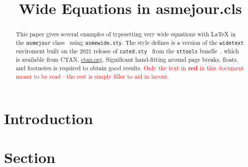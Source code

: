 


\title{Wide Equations in asmejour.cls}
    
\begin{abstract}
This paper gives several examples of typesetting very wide equations with {\upshape\LaTeX} in the {\upshape\texttt{asmejour}} class~{\upshape\cite{lienhard2021}} using 
{\upshape\texttt{asmewide.sty}}. The style defines is a version of the {\upshape\texttt{widetext}} enviroment built on the 2021 release of 
{\upshape\texttt{cuted.sty}}~{\upshape\cite{tolucsis1}} from the
{\upshape\texttt{sttools}} bundle~{\upshape\cite{tolucsis2}}, which is available from CTAN, \href{http://ctan.org}{ctan.org}.  
Significant hand-fitting around page breaks, floats, and footnotes is required to obtain good results. \textcolor{red}{Only the text 
in \textbf{red} in this document meant to be read---the rest is simply filler to aid in layout.}
\end{abstract}

\maketitle

\section{Introduction}
\lipsum[1-3]
\section{Section}
\lipsum[4]

